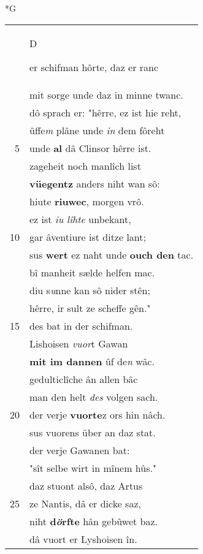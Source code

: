 \documentclass[8pt,a4paper,notitlepage]{article}
\begin{document}
\newpage
\begin{table}[ht]
\begin{minipage}[t]{0.5\linewidth}
\small
\begin{center}*G
\end{center}
\begin{tabular}{rl}
 & \begin{large}D\end{large}er schifman hôrte, daz er ranc\\ 
 & mit sorge unde daz in minne twanc.\\ 
 & dô sprach er: "hêrre, ez ist hie reht,\\ 
 & ûffe\textit{m} plâne unde \textit{in} dem fôreht\\ 
5 & unde \textbf{al} dâ Clinsor hêrre ist.\\ 
 & zageheit noch manlîch list\\ 
 & \textbf{vüegent}\textbf{z} anders niht wan sô:\\ 
 & hiute \textbf{riuwec}, morgen vrô.\\ 
 & ez ist \textit{iu lîhte} unbekant,\\ 
10 & gar âventiure ist ditze lant;\\ 
 & sus \textbf{wert} ez naht unde \textbf{ouch den} tac.\\ 
 & bî manheit sælde helfen mac.\\ 
 & diu s\textit{u}nne kan sô nider stên;\\ 
 & hêrre, ir sult ze scheffe gên."\\ 
15 & des bat in der schifman.\\ 
 & Lishoisen \textit{vuor}t Gawan\\ 
 & \textbf{mit im dannen} ûf de\textit{n} wâc.\\ 
 & gedulticlîche ân allen bâc\\ 
 & man den helt \textit{des} volgen sach.\\ 
20 & der verje \textbf{vuorte}z ors hin nâch.\\ 
 & sus vuorens über an daz stat.\\ 
 & der verje Gawanen bat:\\ 
 & "sît selbe wirt in mînem hûs."\\ 
 & daz stuont alsô, daz Artus\\ 
25 & ze Nantis, dâ er dicke saz,\\ 
 & niht \textbf{d\textit{ö}rfte} hân gebûwet baz.\\ 
 & dâ vuort er Lyshoisen în.\\ 

\end{tabular}
\end{minipage}
\end{table}
\end{document}
